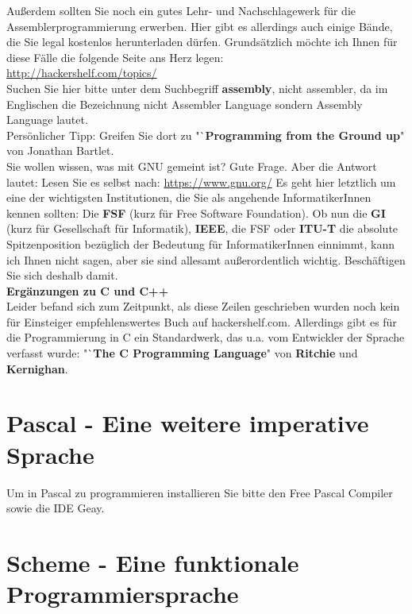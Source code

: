 Außerdem sollten Sie noch ein gutes Lehr- und Nachschlagewerk für die Assemblerprogrammierung erwerben. Hier gibt es allerdings auch einige Bände, die Sie legal kostenlos herunterladen dürfen. Grundsätzlich möchte ich Ihnen für diese Fälle die folgende Seite ans Herz legen:\\ \url{http://hackershelf.com/topics/} \\ Suchen Sie hier bitte unter dem Suchbegriff \textbf{assembly}, nicht assembler, da im Englischen die Bezeichnung nicht Assembler Language sondern Assembly Language lautet.\\

Persönlicher Tipp: Greifen Sie dort zu "`\textbf{Programming from the Ground up}" von Jonathan Bartlet.\\

Sie wollen wissen, was mit GNU gemeint ist? Gute Frage. Aber die Antwort lautet: Lesen Sie es selbst nach: \url{https://www.gnu.org/} Es geht hier letztlich um eine der wichtigsten Institutionen, die Sie als angehende InformatikerInnen kennen sollten: Die \textbf{FSF} (kurz für Free Software Foundation). Ob nun die \textbf{GI} (kurz für Gesellschaft für Informatik), \textbf{IEEE}, die FSF oder \textbf{ITU-T} die absolute Spitzenposition bezüglich der Bedeutung für InformatikerInnen einnimmt, kann ich Ihnen nicht sagen, aber sie sind allesamt außerordentlich wichtig. Beschäftigen Sie sich deshalb damit. \\

\textbf{Ergänzungen zu C und C++}\\

Leider befand sich zum Zeitpunkt, als diese Zeilen geschrieben wurden noch kein für Einsteiger empfehlenswertes Buch auf hackershelf.com. Allerdings gibt es für die Programmierung in C ein Standardwerk, das u.a. vom Entwickler der Sprache verfasst wurde: "`\textbf{The C Programming Language}" von \textbf{Ritchie} und \textbf{Kernighan}.

\section{Pascal - Eine weitere imperative Sprache}

Um in Pascal zu programmieren installieren Sie bitte den \glqq{}Free Pascal Compiler\grqq{} sowie die IDE \glqq{}Geay\grqq{}.

\section{Scheme - Eine funktionale Programmiersprache}

